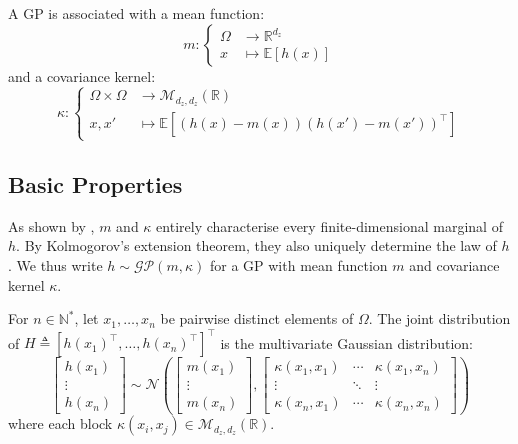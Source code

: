 A GP is associated with a mean function:
\begin{equation}
	m:\left\{\begin{aligned}
	\Omega&\to\mathbb{R}^{d_z}\\
	x&\mapsto\mathbb{E}[h(x)]
	\end{aligned}\right.
\end{equation}
and a covariance kernel:
\begin{equation}
	\kappa:\left\{\begin{aligned}
	\Omega\times\Omega&\to\mathcal{M}_{d_z,d_z}(\mathbb{R})\\
	x,x'&\mapsto\mathbb{E}\left[(h(x)-m(x))(h(x')-m(x'))^\top\right]
	\end{aligned}\right.
\end{equation}

\subsection{Basic Properties}

As shown by , $m$ and $\kappa$ entirely characterise every finite-dimensional marginal of $h$. By Kolmogorov's extension theorem, they also uniquely determine the law of $h$. We thus write $h\sim\mathcal{GP}(m,\kappa)$ for a GP with mean function $m$ and covariance kernel $\kappa$.

\begin{proposition}\label{th:GP_marginals}
	For $n\in\mathbb{N}^*$, let $x_1,\dots,x_n$ be pairwise distinct elements of $\Omega$. The joint distribution of $H\triangleq\left[h(x_1)^\top,\dots,h(x_n)^\top\right]^\top$ is the multivariate Gaussian distribution:
	\begin{equation}
		\begin{bmatrix}
		h(x_1)\\\vdots\\h(x_n)
		\end{bmatrix}\sim\mathcal{N}\left(\begin{bmatrix}
		m(x_1)\\\vdots\\m(x_n)
		\end{bmatrix},\begin{bmatrix}
		\kappa(x_1,x_1)&\cdots&\kappa(x_1,x_n)\\\vdots&\ddots&\vdots\\\kappa(x_n,x_1)&\cdots&\kappa(x_n,x_n)
		\end{bmatrix}\right)\label{eq:GP_marginals}
	\end{equation}
	where each block $\kappa(x_i,x_j)\in\mathcal{M}_{d_z,d_z}(\mathbb{R})$.
\end{proposition}

